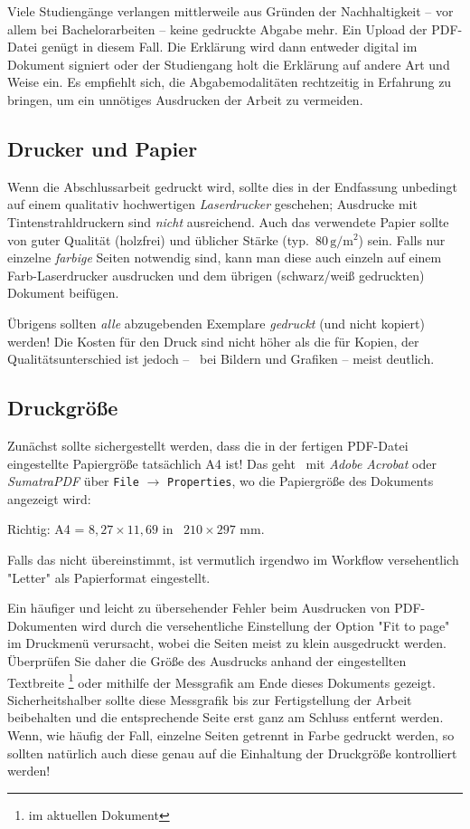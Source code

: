 Viele Studiengänge verlangen mittlerweile aus Gründen der Nachhaltigkeit -- vor
allem bei Bachelorarbeiten -- keine gedruckte Abgabe mehr. Ein Upload der
PDF-Datei genügt in diesem Fall. Die Erklärung wird dann entweder digital im
Dokument signiert oder der Studiengang holt die Erklärung auf andere Art und
Weise ein. Es empfiehlt sich, die Abgabemodalitäten rechtzeitig in Erfahrung zu
bringen, um ein unnötiges Ausdrucken der Arbeit zu vermeiden.

\subsection{Drucker und Papier}

Wenn die Abschlussarbeit gedruckt wird, sollte dies in der Endfassung unbedingt
auf einem qualitativ hochwertigen \emph{Laserdrucker} geschehen; Ausdrucke mit
Tintenstrahldruckern sind \emph{nicht} ausreichend. Auch das verwendete
Papier sollte von guter Qualität (holzfrei) und üblicher Stärke (typ.\  
$80\,\mathrm{g} / \mathrm{m}^2$) sein. Falls nur einzelne \emph{farbige} Seiten 
notwendig sind, kann man diese auch einzeln auf einem Farb-Laserdrucker ausdrucken
und dem übrigen (schwarz/weiß gedruckten) Dokument beifügen.

Übrigens sollten \emph{alle} abzugebenden Exemplare \emph{gedruckt} (und
nicht kopiert) werden! Die Kosten für den Druck sind nicht höher als die für
Kopien, der Qualitätsunterschied ist jedoch -- \va\ bei Bildern und Grafiken
-- meist deutlich.

\subsection{Druckgröße}

Zunächst sollte sichergestellt werden, dass die in der fertigen PDF-Datei
eingestellte Papiergröße tatsächlich \textrm{A4} ist! Das geht \zB\ mit
\emph{Adobe Acrobat} oder \emph{SumatraPDF} über \texttt{File} $\rightarrow$
\texttt{Properties}, wo die Papiergröße des Dokuments angezeigt wird:
\begin{center}
	\textrm{Richtig:} A4 = $8{,}27 \times 11{,}69$ in \bzw\ $210 \times 297$ mm.
\end{center}
Falls das nicht übereinstimmt, ist vermutlich irgendwo im Workflow versehentlich
"Letter" als Papierformat eingestellt.


Ein häufiger und leicht zu übersehender Fehler beim Ausdrucken von
PDF-Doku\-menten wird durch die versehentliche Einstellung der Option "Fit to
page" im Druckmenü verursacht, wobei die Seiten meist zu klein ausgedruckt
werden. Überprüfen Sie daher die Größe des Ausdrucks anhand der eingestellten
Textbreite%
\footnote{\Convert[unit=mm]{\the\textwidth}	im aktuellen Dokument} %
oder mithilfe der Messgrafik am Ende dieses Dokuments gezeigt.
Sicherheitshalber sollte diese Messgrafik bis zur Fertigstellung der
Arbeit beibehalten und die entsprechende Seite erst ganz am Schluss
entfernt werden. Wenn, wie häufig der Fall, einzelne Seiten getrennt in Farbe
gedruckt werden, so sollten natürlich auch diese genau auf die Einhaltung der
Druckgröße kontrolliert werden!